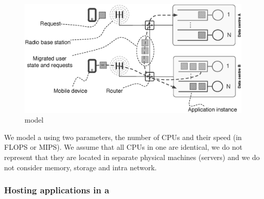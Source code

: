 \subsection{\Dc}
\begin{figure}[tb]
	\centering
	\includegraphics[width=0.8\linewidth]{fig_dc_model_horizontal.eps} 
	\caption{\Dc{} model}
	\label{fig:dc_model}
\end{figure}

We model a \dc{} using two parameters, the number of CPUs and their speed (in FLOPS or MIPS).
We assume that all CPUs in one \dc{} are identical, we do not represent that they are located in separate physical machines (servers) and we do not consider memory, storage and intra \dc{} network.



\subsubsection{Hosting applications in a \dc{}}

